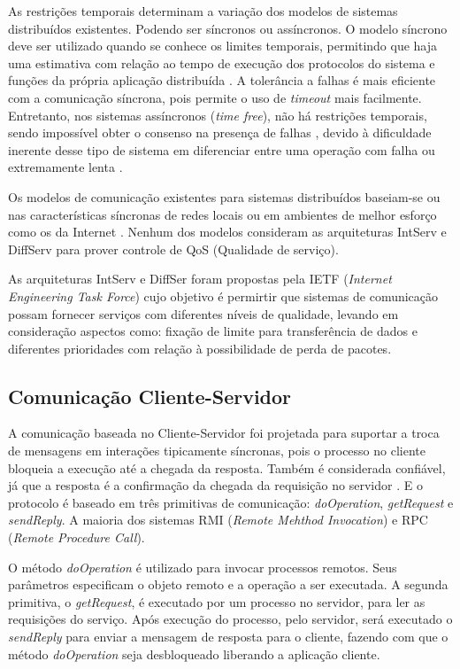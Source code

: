 \documentclass[
	12pt,				%
	oneside,			%
	a4paper,			%
	english,			%
	brazil				%
	]{abntex2ppgsi}
\begin{document}
As restrições temporais determinam a variação dos modelos de sistemas distribuídos existentes. Podendo ser síncronos ou assíncronos. O modelo síncrono deve ser utilizado quando se conhece os limites temporais, permitindo que haja uma estimativa com relação ao tempo de execução dos protocolos do sistema e funções  da própria aplicação distribuída \cite{lamport1982byzantine} \cite{lynch1996distributed} \cite{cristian1991reaching}. A tolerância a falhas é mais eficiente com a comunicação síncrona, pois permite o uso de \textit{timeout} mais facilmente. Entretanto, nos sistemas assíncronos (\textit{time free}), não há restrições temporais, sendo impossível obter o consenso  na presença de falhas \cite{fischer1985impossibility} \cite{de2000failure}, devido à dificuldade inerente desse tipo de sistema em diferenciar entre uma operação com falha ou extremamente lenta \cite{gorender2002modelo}.

Os modelos de comunicação existentes para sistemas distribuídos baseiam-se ou nas características síncronas de redes locais ou em ambientes de melhor esforço como os da Internet \cite{gorender2002modelo}. Nenhum dos modelos consideram as arquiteturas IntServ e DiffServ para prover controle de QoS (Qualidade de serviço).

As arquiteturas IntServ e DiffSer foram propostas pela IETF (\textit{Internet Engineering Task Force}) cujo objetivo  é permirtir que sistemas de comunicação possam fornecer serviços com diferentes níveis de qualidade, levando em consideração aspectos como: fixação de limite para transferência de dados e diferentes prioridades com relação à possibilidade de perda de pacotes.

\subsection{Comunicação Cliente-Servidor}

A comunicação baseada no Cliente-Servidor foi projetada para suportar a troca de mensagens em interações tipicamente síncronas, pois o processo no cliente bloqueia a execução até a chegada da resposta. Também é considerada confiável, já que a resposta é a confirmação da chegada da requisição no servidor \cite{coulouris2013sistemas}. E o protocolo é baseado em três primitivas de comunicação: \textit{doOperation}, \textit{getRequest} e \textit{sendReply}. A maioria dos sistemas RMI (\textit{Remote Mehthod Invocation}) e RPC (\textit{Remote Procedure Call}).

O método \textit{doOperation} é utilizado para invocar processos remotos. Seus parâmetros especificam  o objeto remoto e a operação a ser executada. A segunda primitiva, o \textit{getRequest}, é executado por um processo no servidor, para ler as requisições do serviço. Após execução do processo, pelo servidor, será executado o \textit{sendReply} para enviar a mensagem de resposta para o cliente, fazendo com que o método \textit{doOperation} seja desbloqueado liberando a aplicação cliente.
\end{document}
